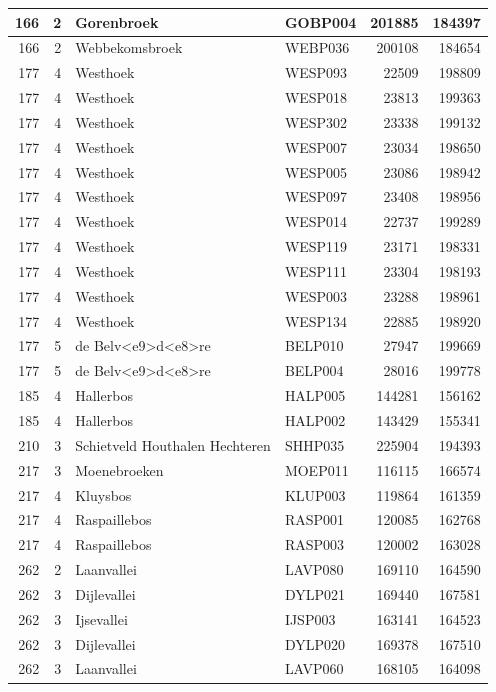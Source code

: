 \documentclass[11pt,]{book}
\begin{document}
\begin{table}
\begin{tabular}[t]{r|r|l|l|r|r}
166 & 2 & Gorenbroek & GOBP004 & 201885 & 184397\\
\hline
166 & 2 & Webbekomsbroek & WEBP036 & 200108 & 184654\\
\hline
177 & 4 & Westhoek & WESP093 & 22509 & 198809\\
\hline
177 & 4 & Westhoek & WESP018 & 23813 & 199363\\
\hline
177 & 4 & Westhoek & WESP302 & 23338 & 199132\\
\hline
177 & 4 & Westhoek & WESP007 & 23034 & 198650\\
\hline
177 & 4 & Westhoek & WESP005 & 23086 & 198942\\
\hline
177 & 4 & Westhoek & WESP097 & 23408 & 198956\\
\hline
177 & 4 & Westhoek & WESP014 & 22737 & 199289\\
\hline
177 & 4 & Westhoek & WESP119 & 23171 & 198331\\
\hline
177 & 4 & Westhoek & WESP111 & 23304 & 198193\\
\hline
177 & 4 & Westhoek & WESP003 & 23288 & 198961\\
\hline
177 & 4 & Westhoek & WESP134 & 22885 & 198920\\
\hline
177 & 5 & de Belv<e9>d<e8>re & BELP010 & 27947 & 199669\\
\hline
177 & 5 & de Belv<e9>d<e8>re & BELP004 & 28016 & 199778\\
\hline
185 & 4 & Hallerbos & HALP005 & 144281 & 156162\\
\hline
185 & 4 & Hallerbos & HALP002 & 143429 & 155341\\
\hline
210 & 3 & Schietveld Houthalen Hechteren & SHHP035 & 225904 & 194393\\
\hline
217 & 3 & Moenebroeken & MOEP011 & 116115 & 166574\\
\hline
217 & 4 & Kluysbos & KLUP003 & 119864 & 161359\\
\hline
217 & 4 & Raspaillebos & RASP001 & 120085 & 162768\\
\hline
217 & 4 & Raspaillebos & RASP003 & 120002 & 163028\\
\hline
262 & 2 & Laanvallei & LAVP080 & 169110 & 164590\\
\hline
262 & 3 & Dijlevallei & DYLP021 & 169440 & 167581\\
\hline
262 & 3 & Ijsevallei & IJSP003 & 163141 & 164523\\
\hline
262 & 3 & Dijlevallei & DYLP020 & 169378 & 167510\\
\hline
262 & 3 & Laanvallei & LAVP060 & 168105 & 164098\\

\end{tabular}
\end{table}
\end{document}
